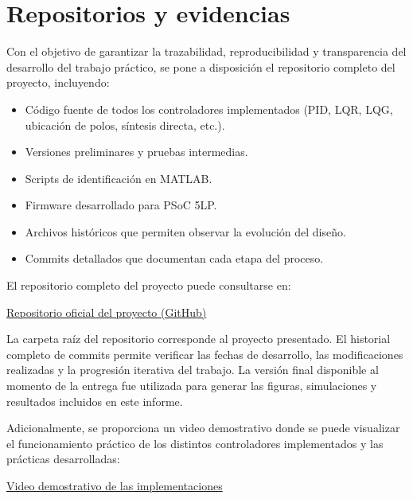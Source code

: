 \onecolumn
\appendices

\section{Repositorios y evidencias}

Con el objetivo de garantizar la trazabilidad, reproducibilidad y transparencia
del desarrollo del trabajo práctico, se pone a disposición el repositorio
completo del proyecto, incluyendo:

\begin{itemize}
	\item Código fuente de todos los controladores implementados (PID, LQR, LQG, ubicación de polos, síntesis directa, etc.).
	\item Versiones preliminares y pruebas intermedias.
	\item Scripts de identificación en MATLAB.
	\item Firmware desarrollado para PSoC 5LP.
	\item Archivos históricos que permiten observar la evolución del diseño.
	\item Commits detallados que documentan cada etapa del proceso.
\end{itemize}

El repositorio completo del proyecto puede consultarse en:

\begin{center}
	\href{https://github.com/simplementeUnPorito/auto}{Repositorio oficial del proyecto (GitHub)}
\end{center}

La carpeta raíz del repositorio corresponde al proyecto presentado.
El historial completo de commits permite verificar las fechas de desarrollo,
las modificaciones realizadas y la progresión iterativa del trabajo.
La versión final disponible al momento de la entrega fue utilizada para
generar las figuras, simulaciones y resultados incluidos en este informe.

Adicionalmente, se proporciona un video demostrativo donde se puede
visualizar el funcionamiento práctico de los distintos controladores
implementados y las prácticas desarrolladas:

\begin{center}
	\href{https://onedrive.live.com/?qt=allmyphotos&photosData=%2Fshare%2F316EBACFC0E21183%21s88f2c40124b1443f88bc3d653bf2f29f%3Fithint%3Dvideo%26e%3DVpVrXT%26migratedtospo%3Dtrue&cid=316EBACFC0E21183&id=316EBACFC0E21183%21s88f2c40124b1443f88bc3d653bf2f29f&redeem=aHR0cHM6Ly8xZHJ2Lm1zL3YvYy8zMTZlYmFjZmMwZTIxMTgzL0lRQUJ4UEtJc1NRX1JJaThQV1U3OHZLZkFVdmNhbVpaQ2lFRHZWa1RYLURrX3hZP2U9VnBWclhU&v=photos}{Video demostrativo de las implementaciones}
\end{center}


